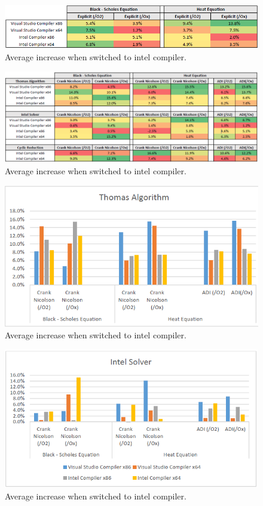 \documentclass[12pt, oneside]{book}
\theoremstyle{plain}
\theoremstyle{definition}
\begin{document}
\begin{figure}[!htb]
    \centering
        \includegraphics[scale=0.7]{expFlagPercent.png}
    \caption{Average increase when switched to intel compiler.}
\end{figure}
\begin{figure}[!htb]
    \centering
        \includegraphics[scale=0.6]{FlagPercent.png}
    \caption{Average increase when switched to intel compiler.}
\end{figure}

\begin{figure}[!htb]
    \centering
        \includegraphics[scale=0.6]{thomasFlagBar.png}
    \caption{Average increase when switched to intel compiler.}
\end{figure}

\begin{figure}[!htb]
    \centering
        \includegraphics[scale=0.6]{intelFlagBar.png}
    \caption{Average increase when switched to intel compiler.}
\end{figure}
\end{document}
